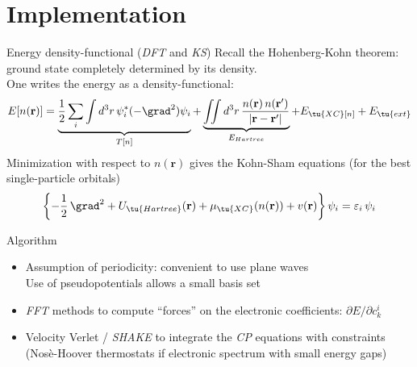 \section{Implementation}

\begin{frame}{Energy density-functional (\emph{DFT} and \emph{KS})}
	Recall the \alert{Hohenberg-Kohn theorem}: ground state completely determined by its density.\\
	One writes the energy as a \alert{density-functional}:
	\[
		E[n(\textbf{r})] = \underbrace{\frac{1}{2}\sum_i\int d^3r\, \psi_i^*(-\grad^2)\psi_i}_{T[n]} + \underbrace{\iint d^3r\,\frac{n(\textbf{r})\,n(\textbf{r}')}{|\textbf{r} - \textbf{r}'|}}_{E_{Hartree}} + E_\tu{XC}[n] + E_\tu{ext}
	\]
	Minimization with respect to $n(\textbf{r})$ gives the \alert{Kohn-Sham equations} (for the best single-particle orbitals)
	\[
		\left\{ -\frac{1}{2}\,\grad^2 + U_\tu{Hartree}(\textbf{r}) + \mu_\tu{XC}(n(\textbf{r})) + v(\textbf{r}) \right\}\psi_i = \varepsilon_i\,\psi_i
	\]
\end{frame}

\begin{frame}{Algorithm}
	\begin{itemize}
		\item Assumption of periodicity: convenient to use \alert{plane waves}\\
			Use of \alert{pseudopotentials} allows a small basis set
		\item \alert{\emph{FFT} methods} to compute ``forces'' on the electronic coefficients: $\partial E/\partial c_k^i$
		\item \alert{Velocity Verlet / \emph{SHAKE}} to integrate the \emph{CP} equations with constraints\\
			(\alert{Nosè-Hoover thermostats} if electronic spectrum with small energy gaps)
	\end{itemize}	
\end{frame}



